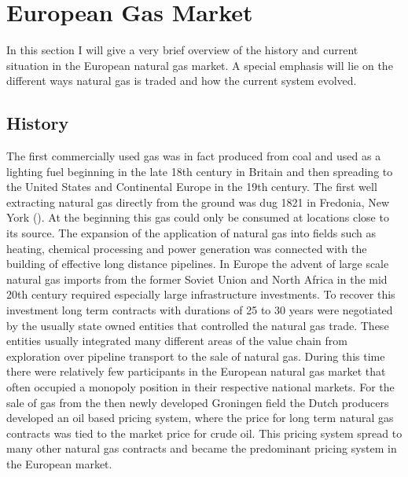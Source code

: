 \section{European Gas Market}
In this section I will give a very brief overview of the history and current situation in the European natural gas market. A special emphasis will lie on the different ways natural gas is traded and how the current system  evolved. 

\subsection{History}
The first commercially used gas was in fact produced from coal and used as a lighting fuel beginning in the late 18th century in Britain and then spreading to the United States and Continental Europe in the 19th century. The first well extracting natural gas directly from the ground was dug 1821 in Fredonia, New York (\cite{heather_evolution_2015}). At the beginning this gas could only be consumed at locations close to its source. The expansion of the application of natural gas into fields such as heating, chemical processing and power generation was connected with the building of effective long distance pipelines. In Europe the advent of large scale natural gas imports from the former Soviet Union and North Africa in the mid 20th century required especially large infrastructure investments. To recover this investment  long term contracts with durations of 25 to 30 years were negotiated by the usually state owned entities that controlled the natural gas trade. These entities usually integrated many different areas of the value chain from exploration over pipeline transport to the sale of natural gas. During this time there were relatively few participants in the European natural gas market that often occupied a monopoly position in their respective national markets.
For the sale of gas from the then newly developed Groningen field  the Dutch producers developed an oil based pricing system, where the price for long term natural gas contracts was tied to the market price for crude oil. This pricing system spread to many other natural gas contracts and became the predominant pricing system in the European market.
